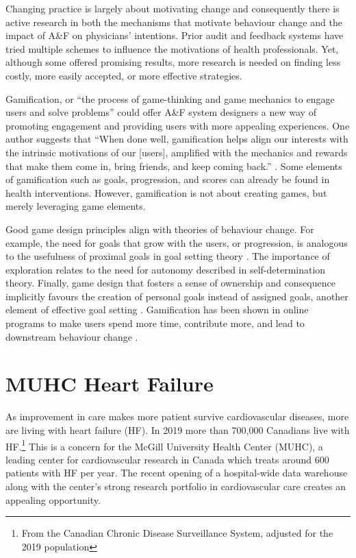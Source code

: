 Changing practice is largely about motivating change and consequently there is active research in both the mechanisms that motivate behaviour change \cite{michie2011behaviour} and the impact of A\&F on physicians' intentions\cite{gude2018health}. Prior audit and feedback systems have tried multiple schemes to influence the motivations of health professionals. Yet, although some offered promising results, more research is needed on finding less costly, more easily accepted, or more effective strategies.

Gamification, or “the process of game-thinking and game mechanics to engage users and solve problems” \cite{zichermann2011gamification} could offer A\&F system designers a new way of promoting engagement and providing users with more appealing experiences. One author suggests that “When done well, gamification helps align our interests with the intrinsic motivations of our [users], amplified with the mechanics and rewards that make them come in, bring friends, and keep coming back.” \cite{zichermann2011gamification}. Some elements of gamification such as goals, progression, and scores can already be found in health interventions. However, gamification is not about creating games, but merely leveraging game elements.\cite{deterding2011game}

Good game design principles align with theories of behaviour change. For example, the need for goals that grow with the users, or progression, is analogous to the usefulness of proximal goals in goal setting theory \cite{locke2002building}. The importance of exploration relates to the need for autonomy described in self-determination theory. Finally, game design that fosters a sense of ownership and consequence implicitly favours the creation of personal goals instead of assigned goals, another element of effective goal setting \cite{locke1990theory}. Gamification has been shown in online programs to make users spend more time, contribute more, and lead to downstream behaviour change \cite{looyestyn2017does}.

\section{MUHC Heart Failure}
As improvement in care makes more patient survive cardiovascular diseases, more are living with heart failure (\gls{HF}). In 2019 more than 700,000 Canadians live with \gls{HF}.\footnote{From the Canadian Chronic Disease Surveillance System, adjusted for the 2019 population} This is a concern for the McGill University Health Center (\gls{MUHC}), a leading center for cardiovascular research in Canada which treats around 600 patients with \gls{HF} per year. The recent opening of a hospital-wide data warehouse along with the center's strong research portfolio in cardiovascular care creates an appealing opportunity.


